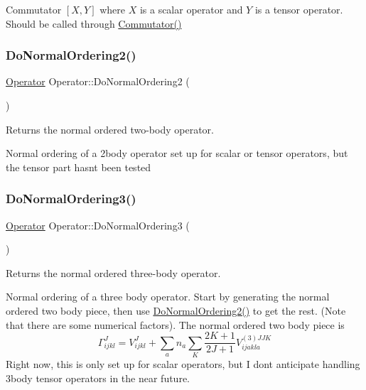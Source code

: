 Commutator $[X,Y]$ where $ X $ is a scalar operator and $Y$ is a tensor operator. Should be called through \hyperlink{classOperator_a88b0cafa371bca287379a0ce89627e2b}{Commutator()} \mbox{\label{classOperator_a652d989590422a2b26e662625b07254e}} 
\subsubsection{\texorpdfstring{Do\+Normal\+Ordering2()}{DoNormalOrdering2()}}
{\footnotesize\ttfamily \hyperlink{classOperator}{Operator} Operator\+::\+Do\+Normal\+Ordering2 (\begin{DoxyParamCaption}{ }\end{DoxyParamCaption})}



Returns the normal ordered two-\/body operator. 

Normal ordering of a 2body operator set up for scalar or tensor operators, but the tensor part hasn\textquotesingle{}t been tested \mbox{\label{classOperator_a7fd029569796107c87ff17c5a7912480}} 
\subsubsection{\texorpdfstring{Do\+Normal\+Ordering3()}{DoNormalOrdering3()}}
{\footnotesize\ttfamily \hyperlink{classOperator}{Operator} Operator\+::\+Do\+Normal\+Ordering3 (\begin{DoxyParamCaption}{ }\end{DoxyParamCaption})}



Returns the normal ordered three-\/body operator. 

Normal ordering of a three body operator. Start by generating the normal ordered two body piece, then use \hyperlink{classOperator_a652d989590422a2b26e662625b07254e}{Do\+Normal\+Ordering2()} to get the rest. (Note that there are some numerical factors). The normal ordered two body piece is \[ \Gamma^J_{ijkl} = V^J_{ijkl} + \sum_a n_a \sum_K \frac{2K+1}{2J+1} V^{(3)JJK}_{ijakla} \] Right now, this is only set up for scalar operators, but I don\textquotesingle{}t anticipate handling 3body tensor operators in the near future. \mbox{\label{classOperator_a55361c46e22f6e7c3d62d8821a8f08c8}} 
